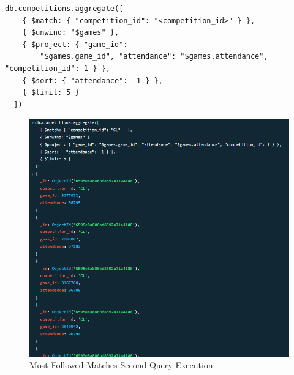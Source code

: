 \documentclass{Configuration_Files/PoliMi3i_thesis}
\begin{document}
\begin{verbatim}
db.competitions.aggregate([
    { $match: { "competition_id": "<competition_id>" } },
    { $unwind: "$games" },
    { $project: { "game_id": 
        "$games.game_id", "attendance": "$games.attendance", "competition_id": 1 } },
    { $sort: { "attendance": -1 } },
    { $limit: 5 }
  ])           
\end{verbatim}
\begin{figure}[htbp]
    \centering
    \includegraphics[scale=0.9]{Images/Queries/Competitions/most_followed_games/mfgcl.png}
    \caption{Most Followed Matches Second Query Execution}
\end{figure}
\end{document}
